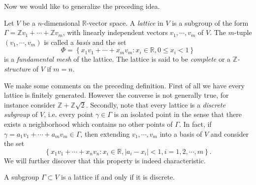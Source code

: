 Now we would like to generalize the preceding idea.
\begin{definition}
Let $V$ be a $n$-dimensional $\mathbb{R}$-vector space. A \textit{lattice} in $V$ is a subgroup of the form $\Gamma=\mathbb{Z}v_1+\cdots+\mathbb{Z}v_m$, with linearly independent vectors $v_1,\cdots,v_m$ of $V$. The $m$-tuple $(v_1,\cdots,v_m)$ is called a \textit{basis} and the set 
$$
\Phi =\left\{ x_1v_1+\cdots +x_mv_m:x_i\in \mathbb{R} ,0\le x_i<1 \right\} 
$$
is a \textit{fundamental mesh} of the lattice. The lattice is said to be \textit{complete} or a \textit{$\mathbb{Z}$-structure} of $V$ if $m=n$.
\end{definition}
We make some comments on the preceding definition. First of all we have every lattice is finitely generated. However the converse is not generally true, for instance consider $\mathbb{Z}+\mathbb{Z}\sqrt{2}$. Secondly, note that every lattice is a \textit{discrete subgroup} of $V$, i.e. every point $\gamma\in\Gamma$ is an isolated point in the sense that there exists a neighborhood which contains no other points of $\Gamma$. In fact, if $\gamma=a_1v_1+\cdots+a_mv_m\in\Gamma$, then extending $v_1,\cdots,v_m$ into a basis of $V$ and consider the set 
$$
\left\{ x_1v_1+\cdots +x_nv_n:x_i\in \mathbb{R} ,\left| a_i-x_i \right|<1,i=1,2,\cdots ,m \right\} .
$$
We will further discover that this property is indeed characteristic.
\begin{proposition}
A subgroup $\Gamma\subset V$ is a lattice if and only if it is discrete.
\end{proposition}
